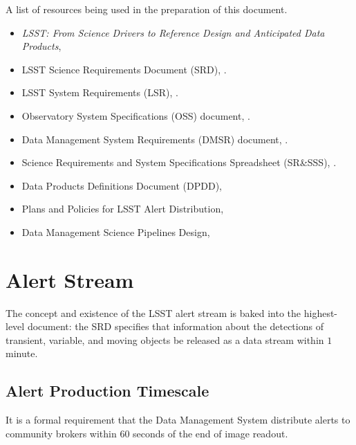 \documentclass[DM,authoryear,toc]{lsstdoc}
\begin{document}
A list of resources being used in the preparation of this document.
\begin{itemize}
\item {\it LSST: From Science Drivers to Reference Design and Anticipated Data Products}, \citet{2008arXiv0805.2366I}
\item LSST Science Requirements Document (SRD), .
\item LSST System Requirements (LSR), .
\item Observatory System Specifications (OSS) document, .
\item Data Management System Requirements (DMSR) document, .
\item Science Requirements and System Specifications Spreadsheet (SR\&SSS), .
\item Data Products Definitions Document (DPDD), 
\item Plans and Policies for LSST Alert Distribution, 
\item Data Management Science Pipelines Design, 
\end{itemize}

\section{Alert Stream} \label{sec:alerts}

The concept and existence of the LSST alert stream is baked into the highest-level document: the SRD specifies that information about the detections of transient, variable, and moving objects be released as a data stream within $1$ minute. 

\subsection{Alert Production Timescale}\label{ssec:OTT1}

It is a formal requirement that the Data Management System distribute alerts to community brokers within $60$ seconds of the end of image readout.
\end{document}
